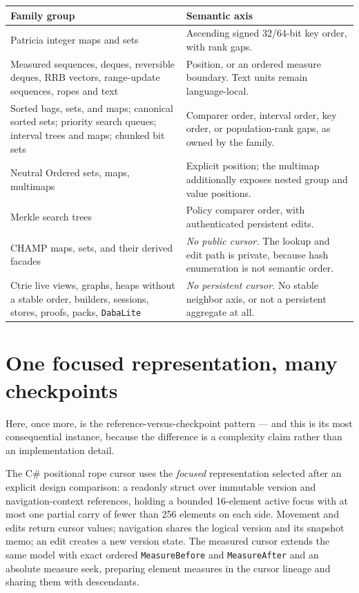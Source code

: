 \documentclass[11pt,twoside,openright]{book}
\makeatletter
\newcommand{\code}[1]{\texorpdfstring{\textcolor{d7ink}{\texttt{#1}}}{#1}}
\newcommand{\term}[1]{\textit{#1}}
\newenvironment{d7table}[1]
  {\par\vspace{3pt}\small
   \setlength{\LTpre}{4pt}\setlength{\LTpost}{4pt}
   \begin{longtable}{@{}%
     >{\raggedright\arraybackslash}p{#1\textwidth}%
     @{\hspace{10pt}}%
     >{\raggedright\arraybackslash}p{\dimexpr\textwidth-#1\textwidth-10pt\relax}@{}}}
  {\end{longtable}}
\newcommand{\thead}[1]{\sffamily\bfseries\footnotesize\color{d7ink}#1}
\makeatother
\begin{document}
\begin{d7table}{0.30}
\toprule
\thead{Family group} & \thead{Semantic axis} \\
\midrule
Patricia integer maps and sets & Ascending signed 32/64-bit key order, with rank
gaps. \\
Measured sequences, deques, reversible deques, RRB vectors, range-update
sequences, ropes and text & Position, or an ordered measure boundary. Text units
remain language-local. \\
Sorted bags, sets, and maps; canonical sorted sets; priority search queues;
interval trees and maps; chunked bit sets & Comparer order, interval order, key
order, or population-rank gaps, as owned by the family. \\
Neutral Ordered sets, maps, multimaps & Explicit position; the multimap
additionally exposes nested group and value positions. \\
Merkle search trees & Policy comparer order, with authenticated persistent
edits. \\
\midrule
CHAMP maps, sets, and their derived facades & \emph{No public cursor.} The
lookup and edit path is private, because hash enumeration is not semantic order. \\
Ctrie live views, graphs, heaps without a stable order, builders, sessions,
stores, proofs, packs, \code{DabaLite} & \emph{No persistent cursor.} No stable
neighbor axis, or not a persistent aggregate at all. \\
\bottomrule
\end{d7table}

\section{One focused representation, many checkpoints}

Here, once more, is the reference-versus-checkpoint pattern --- and this is its
most consequential instance, because the difference is a complexity claim rather
than an implementation detail.

The C\# positional rope cursor uses the \term{focused} representation selected
after an explicit design comparison: a readonly struct over immutable version and
navigation-context references, holding a bounded 16-element active focus with at
most one partial carry of fewer than 256 elements on each side. Movement and
edits return cursor values; navigation shares the logical version and its
snapshot memo; an edit creates a new version state. The measured cursor extends
the same model with exact ordered \code{MeasureBefore} and \code{MeasureAfter}
and an absolute measure seek, preparing element measures in the cursor lineage
and sharing them with descendants.
\end{document}
